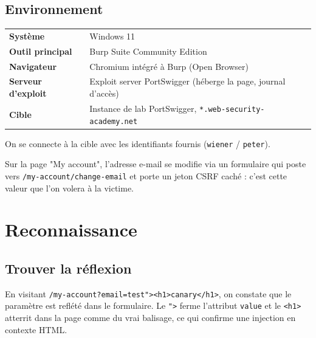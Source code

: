 \documentclass[11pt,a4paper]{article}
\begin{document}
\subsection{Environnement}
\renewcommand{\arraystretch}{1.3}
\begin{tabular}{@{}p{}p{}@{}}
  \textbf{Système}         & Windows 11 \\
  \textbf{Outil principal} & Burp Suite Community Edition \\
  \textbf{Navigateur}      & Chromium intégré à Burp (Open Browser) \\
  \textbf{Serveur d'exploit} & Exploit server PortSwigger (héberge la page, journal d'accès) \\
  \textbf{Cible}           & Instance de lab PortSwigger, \texttt{*.web-security-academy.net} \\
\end{tabular}


On se connecte à la cible avec les identifiants fournis (\texttt{wiener} /
\texttt{peter}).


Sur la page "My account", l'adresse e-mail se modifie via un formulaire
qui poste vers \texttt{/my-account/change-email} et porte un jeton CSRF caché :
c'est cette valeur que l'on volera à la victime.


\section{Reconnaissance}

\subsection{Trouver la réflexion}
En visitant \lstinline|/my-account?email=test"><h1>canary</h1>|, on constate
que le paramètre est reflété dans le formulaire. Le \lstinline|">| ferme
l'attribut \texttt{value} et le \lstinline|<h1>| atterrit dans la page comme du
vrai balisage, ce qui confirme une injection en contexte HTML.

\end{document}
